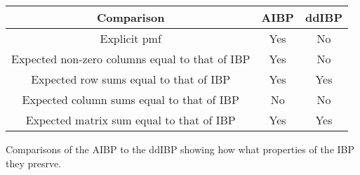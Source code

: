 \begin{center}
  \begin{tabular}{c|c|c}
    \hline
      Comparison & AIBP & ddIBP \\ \hline \hline
      Explicit pmf & Yes & No \\ \hline
      Expected non-zero columns equal to that of IBP & Yes & No \\ \hline
      Expected row sums equal to that of IBP & Yes & Yes \\ \hline
      Expected column sums equal to that of IBP & No & No \\ \hline
      Expected matrix sum equal to that of IBP & Yes & Yes \\ \hline
    \hline
  \end{tabular}
   {Comparisons of the AIBP to the ddIBP showing how what 
                     properties of the IBP they presrve.}
\end{center}

